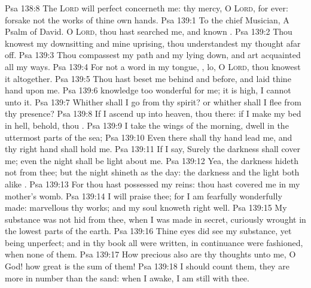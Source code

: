 \vs Psa 138:8 The \textsc{Lord} will perfect  concerneth me: thy mercy, O \textsc{Lord},  for ever: forsake not the works of thine own hands.
\vs Psa 139:1 To the chief Musician, A Psalm of David. O \textsc{Lord}, thou hast searched me, and known .
\vs Psa 139:2 Thou knowest my downsitting and mine uprising, thou understandest my thought afar off.
\vs Psa 139:3 Thou compassest my path and my lying down, and art acquainted  all my ways.
\vs Psa 139:4 For  not a word in my tongue, , lo, O \textsc{Lord}, thou knowest it altogether.
\vs Psa 139:5 Thou hast beset me behind and before, and laid thine hand upon me.
\vs Psa 139:6  knowledge  too wonderful for me; it is high, I cannot  unto it.
\vs Psa 139:7 Whither shall I go from thy spirit? or whither shall I flee from thy presence?
\vs Psa 139:8 If I ascend up into heaven, thou  there: if I make my bed in hell, behold, thou .
\vs Psa 139:9  I take the wings of the morning,  dwell in the uttermost parts of the sea;
\vs Psa 139:10 Even there shall thy hand lead me, and thy right hand shall hold me.
\vs Psa 139:11 If I say, Surely the darkness shall cover me; even the night shall be light about me.
\vs Psa 139:12 Yea, the darkness hideth not from thee; but the night shineth as the day: the darkness and the light  both alike .
\vs Psa 139:13 For thou hast possessed my reins: thou hast covered me in my mother's womb.
\vs Psa 139:14 I will praise thee; for I am fearfully  wonderfully made: marvellous  thy works; and  my soul knoweth right well.
\vs Psa 139:15 My substance was not hid from thee, when I was made in secret,  curiously wrought in the lowest parts of the earth.
\vs Psa 139:16 Thine eyes did see my substance, yet being unperfect; and in thy book all  were written,  in continuance were fashioned, when  none of them.
\vs Psa 139:17 How precious also are thy thoughts unto me, O God! how great is the sum of them!
\vs Psa 139:18  I should count them, they are more in number than the sand: when I awake, I am still with thee.
